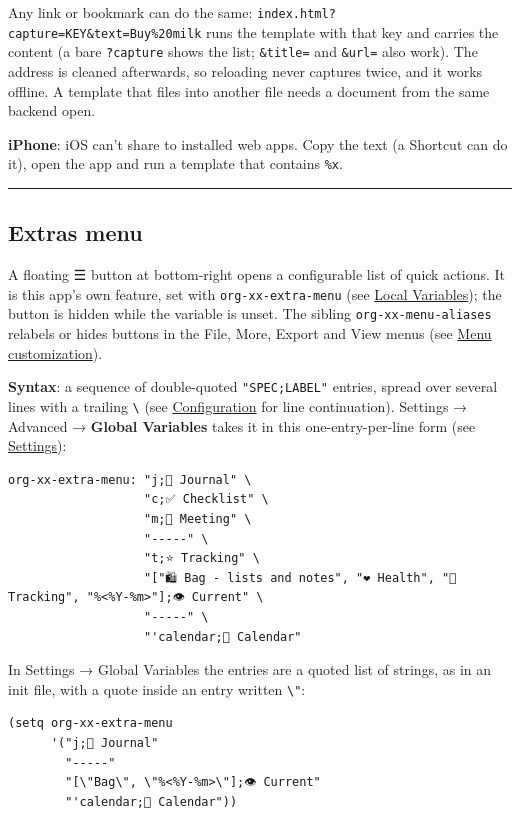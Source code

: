 \documentclass[11pt]{article}
\begin{document}
Any link or bookmark can do the same: \texttt{index.html?capture=KEY\&text=Buy\%20milk} runs the template with that key and carries the content (a bare \texttt{?capture} shows the list; \texttt{\&title=} and \texttt{\&url=} also work). The address is cleaned afterwards, so reloading never captures twice, and it works offline. A template that files into another file needs a document from the same backend open.

\textbf{iPhone}: iOS can't share to installed web apps. Copy the text (a Shortcut can do it), open the app and run a template that contains \texttt{\%x}.

\noindent\rule{\textwidth}{0.5pt}

\subsection{Extras menu}
\label{sec:org147f9a0}
A floating ☰ button at bottom-right opens a configurable list of quick actions. It is this app's own feature, set with \texttt{org-xx-extra-menu} (see \hyperref[sec:org761a631]{Local Variables}); the button is hidden while the variable is unset. The sibling \texttt{org-xx-menu-aliases} relabels or hides buttons in the File, More, Export and View menus (see \hyperref[sec:orgc0b0953]{Menu customization}).

\textbf{Syntax}: a sequence of double-quoted \texttt{"SPEC;LABEL"} entries, spread over several lines with a trailing \texttt{\textbackslash{}} (see \hyperref[sec:orgc6e574d]{Configuration} for line continuation). Settings → Advanced → \textbf{Global Variables} takes it in this one-entry-per-line form (see \hyperref[sec:org788d206]{Settings}):

\begin{verbatim}
org-xx-extra-menu: "j;📔 Journal" \
                   "c;✅ Checklist" \
                   "m;👥 Meeting" \
                   "-----" \
                   "t;⭐ Tracking" \
                   "["🛍️ Bag - lists and notes", "❤️ Health", "🏩 Tracking", "%<%Y-%m>"];👁 Current" \
                   "-----" \
                   "'calendar;📅 Calendar"
\end{verbatim}

In Settings → Global Variables the entries are a quoted list of strings, as in an init file, with a quote inside an entry written \texttt{\textbackslash{}"}:

\begin{verbatim}
(setq org-xx-extra-menu
      '("j;📔 Journal"
        "-----"
        "[\"Bag\", \"%<%Y-%m>\"];👁 Current"
        "'calendar;📅 Calendar"))
\end{verbatim}
\end{document}
